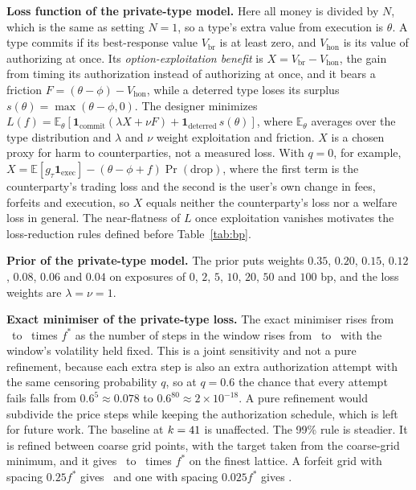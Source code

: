 \documentclass[11pt]{article}
\newcommand{\E}{\mathbb{E}}
\begin{document}
\textbf{Loss function of the private-type model.} Here all money is divided by $N$, which is the same as setting $N=1$, so a type's extra value from execution is $\theta$. A type commits if its best-response value $V_{\mathrm{br}}$ is at least zero, and $V_{\mathrm{hon}}$ is its value of authorizing at once. Its \emph{option-exploitation benefit} is $X=V_{\mathrm{br}}-V_{\mathrm{hon}}$, the gain from timing its authorization instead of authorizing at once, and it bears a friction $F=(\theta-\phi)-V_{\mathrm{hon}}$, while a deterred type loses its surplus $s(\theta)=\max(\theta-\phi,0)$. The designer minimizes $L(f)=\E_\theta[\mathbf 1_{\text{commit}}(\lambda X+\nu F)+\mathbf 1_{\text{deterred}}\,s(\theta)]$, where $\E_\theta$ averages over the type distribution and $\lambda$ and $\nu$ weight exploitation and friction. $X$ is a chosen proxy for harm to counterparties, not a measured loss. With $q=0$, for example, $X=\E[g_\tau\mathbf 1_{\text{exec}}]-(\theta-\phi+f)\Pr(\text{drop})$, where the first term is the counterparty's trading loss and the second is the user's own change in fees, forfeits and execution, so $X$ equals neither the counterparty's loss nor a welfare loss in general. The near-flatness of $L$ once exploitation vanishes motivates the loss-reduction rules defined before Table~\ref{tab:bp}.

\textbf{Prior of the private-type model.} The prior puts weights $0.35$, $0.20$, $0.15$, $0.12$, $0.08$, $0.06$ and $0.04$ on exposures of $0$, $2$, $5$, $10$, $20$, $50$ and $100$ bp, and the loss weights are $\lambda=\nu=1$.

\textbf{Exact minimiser of the private-type loss.} The exact minimiser rises from \BPExactCoarse\ to \BPExactFine\ times $f^*$ as the number of steps in the window rises from \BPStepsLow\ to \BPStepsHigh\ with the window's volatility held fixed. This is a joint sensitivity and not a pure refinement, because each extra step is also an extra authorization attempt with the same censoring probability $q$, so at $q=0.6$ the chance that every attempt fails falls from $0.6^{5}\approx0.078$ to $0.6^{80}\approx2\times10^{-18}$. A pure refinement would subdivide the price steps while keeping the authorization schedule, which is left for future work. The baseline at $k=41$ is unaffected. The 99\% rule is steadier. It is refined between coarse grid points, with the target taken from the coarse-grid minimum, and it gives \BPEpsFineLow\ to \BPEpsFine\ times $f^*$ on the finest lattice. A forfeit grid with spacing $0.25f^*$ gives \BPGridCoarse\ and one with spacing $0.025f^*$ gives \BPGridFine.
\end{document}
